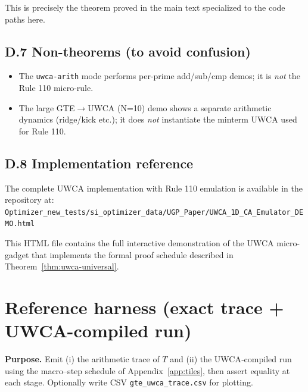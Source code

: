 \documentclass[12pt]{article}
\numberwithin{equation}{section}
\begin{document}
This is precisely the theorem proved in the main text specialized to the code paths here.

\subsection*{D.7  Non-theorems (to avoid confusion)}
\begin{itemize}[leftmargin=1.1em]
  \item The \texttt{uwca-arith} mode performs per-prime add/sub/cmp demos; it is \emph{not} the Rule 110 micro-rule.
  \item The large GTE$\rightarrow$UWCA (N=10) demo shows a separate arithmetic dynamics (ridge/kick etc.); it does \emph{not} instantiate the minterm UWCA used for Rule 110.
\end{itemize}

\subsection*{D.8  Implementation reference}
The complete UWCA implementation with Rule 110 emulation is available in the repository at:
\texttt{Optimizer\_new\_tests/si\_optimizer\_data/UGP\_Paper/UWCA\_1D\_CA\_Emulator\_DEMO.html}

This HTML file contains the full interactive demonstration of the UWCA micro-gadget that implements the formal proof schedule described in Theorem~\ref{thm:uwca-universal}.

\section{Reference harness (exact trace + UWCA-compiled run)}\label{app:harness}

\noindent
\textbf{Purpose.} Emit (i) the arithmetic trace of \(T\) and (ii) the UWCA‑compiled run using the macro–step schedule of Appendix~\ref{app:tiles}, then assert equality at each stage. Optionally write CSV \texttt{gte\_uwca\_trace.csv} for plotting.
\end{document}
